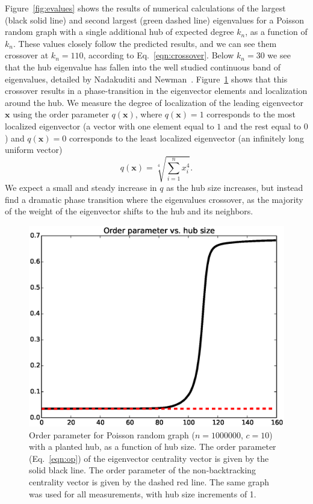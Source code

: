 \documentclass[twocolumn,prl,superscriptaddress]{revtex4}
\renewcommand{\vec}{\mathbf}
\newcommand\colora{black }
\newcommand\colorb{red }
\begin{document}
Figure~\ref{fig:evalues} shows the results of numerical calculations of the largest (\colora solid line) and second largest (green dashed line) eigenvalues for a Poisson random graph with a single additional hub of expected degree $k_n$, as a function of $k_n$. These values closely follow the predicted results, and we can see them crossover at $k_n = 110$, according to Eq.~\ref{eqn:crossover}. Below $k_n = 30$ we see that the hub eigenvalue has fallen into the well studied continuous band of eigenvalues, detailed by Nadakuditi and Newman~\cite{nadakuditi13}. Figure~\ref{fig:order-parameter} shows that this crossover results in a phase-transition in the eigenvector elements and localization around the hub. We measure the degree of localization of the leading eigenvector $\vec{x}$ using the order parameter $q(\vec{x})$, where $q(\vec{x}) = 1$ corresponds to the most localized eigenvector (a vector with one element equal to $1$ and the rest equal to $0$) and $q(\vec{x}) = 0$ corresponds to the least localized eigenvector (an infinitely long uniform vector)
\begin{equation}
q(\vec{x}) = \sqrt[4]{\sum_{i=1}^n x_i ^ 4}.
\label{eqn:op}
\end{equation}
We expect a small and steady increase in $q$ as the hub size increases, but instead find a dramatic phase transition where the eigenvalues crossover, as the majority of the weight of the eigenvector shifts to the hub and its neighbors.

\begin{figure}
\begin{center}
\includegraphics[width=\columnwidth]{op.eps}
\end{center}
\caption{Order parameter for Poisson random graph ($n=1000000$, $c=10$) with a planted hub, as a function of hub size. The order parameter (Eq.~\eqref{eqn:op}) of the eigenvector centrality vector is given by the solid \colora line. The order parameter of the non-backtracking centrality vector is given by the dashed \colorb line. The same graph was used for all measurements, with hub size increments of 1.}
\label{fig:order-parameter}
\end{figure}
\end{document}
